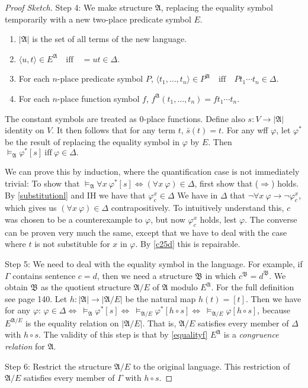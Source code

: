 \begin{proof}[Proof Sketch]
  Step 4: We make structure $\mathfrak{A}$, replacing the equality symbol temporarily with a new two-place predicate symbol $E$.
  \begin{enumerate}[label=(\alph*)]
    \item $|\mathfrak{A}|$ is the set of all terms of the new language.
    \item $\langle u,t\rangle\in E^{\mathfrak{A}}\quad\text{iff}\quad =ut\in \Delta$.
    \item For each $n$-place predicate symbol $P$, $\langle t_1,\dots,t_n\rangle\in P^{\mathfrak{A}}\quad\text{iff}\quad Pt_1\cdots t_n\in\Delta$.
    \item For each $n$-place function symbol $f$, $f^{\mathfrak{A}}(t_1,\dots,t_n)=ft_1\cdots t_n$.
  \end{enumerate}
  The constant symbols are treated as $0$-place functions. Define also $s:V\rightarrow|\mathfrak{A}|$ identity on $V$. It then follows that for any term $t$, $\bar{s}(t)=t$. For any wff $\varphi$, let $\varphi^*$ be the result of replacing the equality symbol in $\varphi$ by $E$. Then $\vDash_{\mathfrak{A}}\varphi^*[s]\ \text{iff}\ \varphi\in \Delta.$

  We can prove this by induction, where the quantification case is not immediately trivial: To show that $\vDash_{\mathfrak{A}}\forall x\ \varphi^*[s]\Leftrightarrow(\forall x\ \varphi)\in \Delta$, first show that ($\Rightarrow$) holds. By \ref{substitutionl} and IH we have that $\varphi_c^x\in \Delta$ We have in $\Delta$ that $\neg\forall x\ \varphi\rightarrow\neg \varphi_c^x$, which gives us $(\forall x\ \varphi)\in \Delta$ contrapositively. To intuitively understand this, $c$ was chosen to be a counterexample to $\varphi$, but now $\varphi_c^x$ holds, lest $\varphi$. The converse can be proven very much the same, except that we have to deal with the case where $t$ is not substituble for $x$ in $\varphi$. By \ref{c25d} this is repairable.

  Step 5: We need to deal with the equality symbol in the language. For example, if $\Gamma$ contains sentence $c=d$, then we need a structure $\mathfrak{B}$ in which $c^{\mathfrak{B}}=d^{\mathfrak{B}}.$ We obtain $\mathfrak{B}$ as the quotient structure $\mathfrak{A}/E$ of $\mathfrak{A}$ modulo $E^{\mathfrak{A}}$. For the full definition see page 140. Let $h:|\mathfrak{A}|\rightarrow|\mathfrak{A}/E|$ be the natural map $h(t)=[t]$. Then we have for any $\varphi$: $\varphi\in \Delta \Leftrightarrow\ \vDash_{\mathfrak{A}}\varphi^*[s]\Leftrightarrow\ \vDash_{\mathfrak{A}/E}\varphi^*[h\circ s]\Leftrightarrow\ \vDash_{\mathfrak{A}/E}\varphi[h\circ s]$, because $E^{\mathfrak{A}/E}$ is the equality relation on $|\mathfrak{A}/E|$. That is, $\mathfrak{A}/E$ satisfies every member of $\Delta$ with $h\circ s$. The validity of this step is that by \ref{equalityf} $E^{\mathfrak{A}}$ is a \textit{congruence relation} for $\mathfrak{A}$.

  Step 6: Restrict the structure $\mathfrak{A}/E$ to the original language. This restriction of $\mathfrak{A}/E$ satisfies every member of $\Gamma$ with $h\circ s$.
\end{proof}

